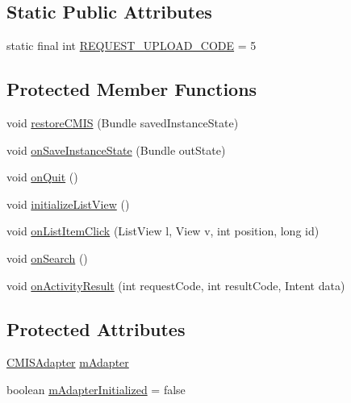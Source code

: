 \subsection*{Static Public Attributes}
\begin{DoxyCompactItemize}
\item 
static final int \hyperlink{classcom_1_1zia_1_1freshdocs_1_1activity_1_1_node_browse_activity_ab77d48e6ca703daed86d2a6c3d610072}{R\-E\-Q\-U\-E\-S\-T\-\_\-\-U\-P\-L\-O\-A\-D\-\_\-\-C\-O\-D\-E} = 5
\end{DoxyCompactItemize}
\subsection*{Protected Member Functions}
\begin{DoxyCompactItemize}
\item 
void \hyperlink{classcom_1_1zia_1_1freshdocs_1_1activity_1_1_node_browse_activity_ac1686ca3b58fd7f1a44cfefd2ec627fd}{restore\-C\-M\-I\-S} (Bundle saved\-Instance\-State)
\item 
void \hyperlink{classcom_1_1zia_1_1freshdocs_1_1activity_1_1_node_browse_activity_a4fdcd8e764fa444d1466afa409c0e5b1}{on\-Save\-Instance\-State} (Bundle out\-State)
\item 
void \hyperlink{classcom_1_1zia_1_1freshdocs_1_1activity_1_1_node_browse_activity_afd9911a720f5f762b6602e686de25a60}{on\-Quit} ()
\item 
void \hyperlink{classcom_1_1zia_1_1freshdocs_1_1activity_1_1_node_browse_activity_a90dfcee457fb8912b3d94bf52e4c4626}{initialize\-List\-View} ()
\item 
void \hyperlink{classcom_1_1zia_1_1freshdocs_1_1activity_1_1_node_browse_activity_a2652f599037236ad0448c9d257e15f73}{on\-List\-Item\-Click} (List\-View l, View v, int position, long id)
\item 
void \hyperlink{classcom_1_1zia_1_1freshdocs_1_1activity_1_1_node_browse_activity_ab573d64dd1802ee215da701200b2ac84}{on\-Search} ()
\item 
void \hyperlink{classcom_1_1zia_1_1freshdocs_1_1activity_1_1_node_browse_activity_a428f371e0d1d80c58d754d5b7a9d83a2}{on\-Activity\-Result} (int request\-Code, int result\-Code, Intent data)
\end{DoxyCompactItemize}
\subsection*{Protected Attributes}
\begin{DoxyCompactItemize}
\item 
\hyperlink{classcom_1_1zia_1_1freshdocs_1_1widget_1_1adapter_1_1_c_m_i_s_adapter}{C\-M\-I\-S\-Adapter} \hyperlink{classcom_1_1zia_1_1freshdocs_1_1activity_1_1_node_browse_activity_a0d7a413cf882e54d2292452b31af1c1a}{m\-Adapter}
\item 
boolean \hyperlink{classcom_1_1zia_1_1freshdocs_1_1activity_1_1_node_browse_activity_a92cb7cb298ea9f6e76a52fde1b795b3d}{m\-Adapter\-Initialized} = false
\end{DoxyCompactItemize}


